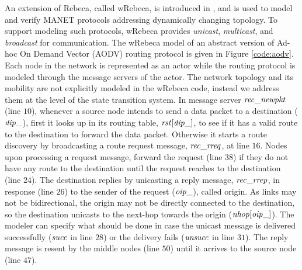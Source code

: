 An extension of Rebeca, called wRebeca, is introduced in \cite{FOAC}, and is used to 
model and verify MANET protocols addressing dynamically changing topology. To support modeling such protocols, wRebeca provides \textit{unicast}, \textit{multicast}, and \textit{broadcast} for communication. The wRebeca model of an abstract version of Ad-hoc On Demand Vector (AODV) routing protocol \cite{AODV} is given in Figure \ref{code:aodv}. Each node in the network is represented as an actor while the routing protocol is modeled through the message servers of the actor. The network topology and its mobility 
are not explicitly modeled in the wRebeca code, instead we address them at the level of the state transition system.  In message server ${\it rec\_newpkt}$ (line $10$),
whenever a source node intends to send a data packet to a destination (${\it dip\_}$), first it looks up in its routing table, ${\it rst}[{\it dip\_}]$, to see if it has a valid route to the destination to forward the data packet. Otherwise it starts a route discovery by broadcasting a route request message, ${\it rec\_rreq}$, at line $16$. Nodes upon processing a request message, forward the request (line $38$) if they do not have any route to the destination until the request reaches to the destination (line $24$). The destination replies by unicasting a reply message, ${\it rec\_rrep}$, in response (line $26$) to the sender of the request (${\it oip\_}$), called origin. As links may not be bidirectional, the origin may not be directly connected to the destination, so the destination unicasts to the next-hop towards the origin (${\it nhop}[{\it oip\_}]$). The modeler can specify what should be done in case the unicast message is delivered
successfully ($\it succ$ in line $28$) %
or the delivery fails ($\it unsucc$ in line $31$). %
The reply message is resent by the middle nodes (line $50$) until it arrives to the source node (line $47$).

